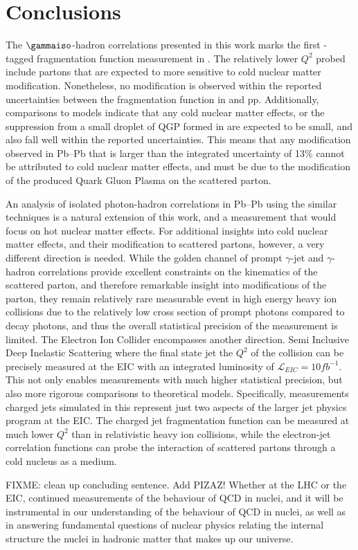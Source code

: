 \chapter{Conclusions}

The $\gammaiso$-hadron correlations presented in this work marks the first \gammaiso-tagged fragmentation function measurement in \pPb. The relatively lower $Q^2$ probed include partons that are expected to more sensitive to cold nuclear matter modification. Nonetheless, no modification is observed within the reported uncertainties between the fragmentation function in \pPb and pp. Additionally, comparisons to models indicate that any cold nuclear matter effects, or the suppression from a small droplet of QGP formed in \pPb are expected to be small, and also fall well within the reported uncertainties. This means that any modification observed in Pb--Pb that is larger than the integrated uncertainty of 13\% cannot be attributed to cold nuclear matter effects, and must be due to the modification of the produced Quark Gluon Plasma on the scattered parton.

An analysis of isolated photon-hadron correlations in Pb--Pb using the similar techniques is a natural extension of this work, and a measurement that would focus on hot nuclear matter effects. For additional insights into cold nuclear matter effects, and their modification to scattered partons, however, a very different direction is needed. While the golden channel of prompt $\gamma$-jet and $\gamma$-hadron correlations provide excellent constraints on the kinematics of the scattered parton, and therefore remarkable insight into modifications of the parton, they remain relatively rare measurable event in high energy heavy ion collisions due to the relatively low cross section of prompt photons compared to decay photons, and thus the overall statistical precision of the measurement is limited. The Electron Ion Collider encompasses another direction. Semi Inclusive Deep Inelastic Scattering where the final state jet the $Q^2$ of the collision can be precisely measured at the EIC with an integrated luminosity of $\mathcal{L}_{EIC}=10fb^{-1}$. This not only enables measurements with much higher statistical precision, but also more rigorous comparisons to theoretical models. Specifically, measurements charged jets simulated in this represent just two aspects of the larger jet physics program at the EIC. The charged jet fragmentation function can be measured at much lower $Q^2$ than in relativistic heavy ion collisions, while the electron-jet correlation functions can probe the interaction of scattered partons through a cold nucleus as a medium. 

FIXME: clean up concluding sentence. Add PIZAZ!
Whether at the LHC or the EIC, continued measurements of the behaviour of QCD in nuclei, and it will be instrumental in our understanding of the behaviour of QCD in nuclei, as well as in answering fundamental questions of nuclear physics relating the internal structure the nuclei in hadronic matter that makes up our universe.




